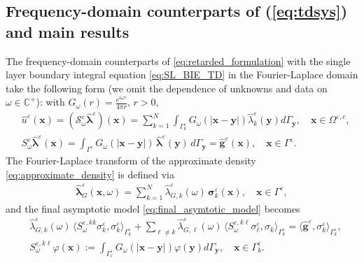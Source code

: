 \documentclass[]{article}
\numberwithin{equation}{section}
\numberwithin{theorem}{section}
\numberwithin{lemma}{section}
\numberwithin{corollary}{section}
\numberwithin{proposition}{section}
\numberwithin{definition}{section}
\newcommand{\blambda}{\boldsymbol{\lambda}}
\newcommand{\re}{\varepsilon}
\renewcommand{\vec}{\boldsymbol}
\begin{document}
	\subsection{Frequency-domain counterparts of (\ref{eq:tdsys}) and main results}
	The frequency-domain counterparts of \eqref{eq:retarded_formulation} with the single layer boundary integral equation \eqref{eq:SL_BIE_TD} in the Fourier-Laplace domain take the following form (we omit the dependence of unknowns and data  on $\omega\in \mathbb{C}^+$): with $G_{\omega}(r) = \frac{e^{i\omega r}}{4\pi r},\,  r > 0$, 
	\begin{align}
		\label{eq:SL_potential}
		&\hat{u}^{\re}(\boldsymbol{x}) = (\mathcal{S}^{\re}_{\omega} \hat{{\blambda}}^{\re})(\boldsymbol{x}) = \sum_{k=1}^{N} \int_{\Gamma^{\re}_k}  G_{\omega}(|\boldsymbol{x} - \boldsymbol{y}|) \hat{\lambda}^{\re}_k (\boldsymbol{y})  d\Gamma_{\boldsymbol{y}}, \quad \boldsymbol{x} \in \Omega^{\re, c}, \\
		\label{eq:SL_BIE_FD}
		&S^{\re}_{\omega} \hat{\boldsymbol{\lambda}}^{\re}(\boldsymbol{x}) 
		= \int_{\Gamma^{\re}} G_{\omega}(|\boldsymbol{x} - \boldsymbol{y}|)\, \hat{\boldsymbol{\lambda}}^{\re}(\boldsymbol{y})\, d\Gamma_{\boldsymbol{y}} 
		= \hat{\boldsymbol{g}}^{\re}(\boldsymbol{x}), \quad \boldsymbol{x} \in \Gamma^{\re}.
	\end{align}
	The Fourier-Laplace transform of the approximate density \eqref{eq:approximate_density} is defined via
	\begin{align}
		\label{eq:approximate_density_frequency_domain}
		\hat{\boldsymbol{\lambda}}^{\re}_G(\boldsymbol{x}, \omega) = \sum_{k=1}^N \hat{\lambda}^{\re}_{G, k}(\omega)\, \boldsymbol{\sigma}_k^{\re}(\boldsymbol{x}), \quad \boldsymbol{x} \in \Gamma^{\re}, 
	\end{align}
	and the final asymptotic model \eqref{eq:final_asymtotic_model} becomes
	\begin{align}
		\label{eq:as_model_fd}
		&\hat{\lambda}^{\re}_{G, k}(\omega)\, \langle S^{\re, kk}_{\omega} \sigma_k^{\re}, \sigma_k^{\re} \rangle_{\Gamma^{\re}_k}
		+ \sum_{\ell \neq k} \hat{\lambda}^{\re}_{G, \ell}(\omega)\, \langle S^{\re, k\ell}_{\omega} \sigma_{\ell}^{\re}, \sigma_k \rangle_{\Gamma^{\re}_k} 
		= \langle \hat{\vec{g}}^{\re}, \sigma_k^{\re} \rangle_{\Gamma^{\re}_k},  \\
		\label{eq:operator_S_kl}
		&S^{\re, k\ell}_{\omega} \varphi(\boldsymbol{x}) := \int_{\Gamma^{\re}_{\ell}} G_{\omega}(|\boldsymbol{x}-\boldsymbol{y}|)\varphi(\boldsymbol{y})d\Gamma_{\boldsymbol{y}}, \quad \boldsymbol{x} \in \Gamma^{\re}_k. 
	\end{align} 
\end{document}
